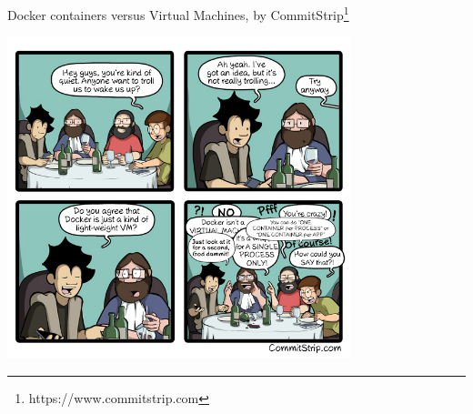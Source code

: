 \documentclass[a4paper,11pt]{exam}
\begin{document}
Docker containers versus Virtual Machines, by CommitStrip\footnote{https://www.commitstrip.com}
\begin{center}
	\includegraphics[width=10cm]{dockercommitstrip.jpg}	
\end{center}
\end{document}
